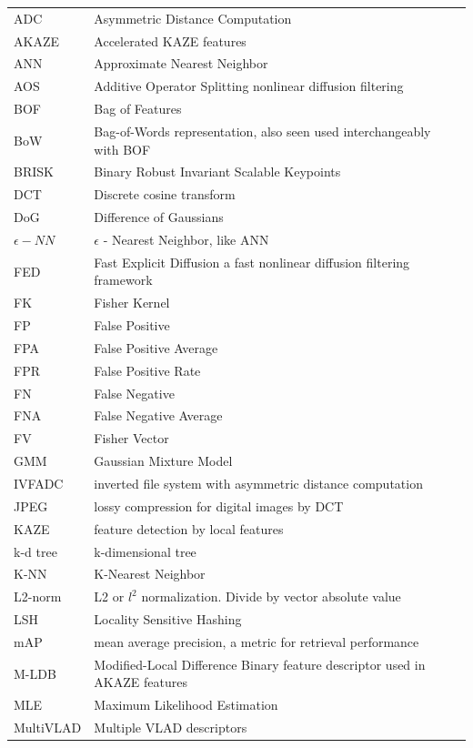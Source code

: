 \documentclass[english,12pt,a4paper,pdftex,elec,utf8, table]{aaltothesis}
\begin{document}
\begin{tabular}{ll}
  ADC & Asymmetric Distance Computation\\
  AKAZE & Accelerated KAZE features\\
  ANN & Approximate Nearest Neighbor\\
  AOS & Additive Operator Splitting nonlinear diffusion filtering\\
  BOF & Bag of Features\\
  BoW & Bag-of-Words representation, also seen used interchangeably with BOF\\
  BRISK & Binary Robust Invariant Scalable Keypoints\\
  DCT & Discrete cosine transform\\
  DoG & Difference of Gaussians\\
  $\epsilon -NN$ & $\epsilon$ - Nearest Neighbor, like ANN\\
  FED & Fast Explicit Diffusion a fast nonlinear diffusion filtering framework\\
  FK & Fisher Kernel\\
  FP & False Positive\\
  FPA & False Positive Average\\
  FPR & False Positive Rate\\
  FN & False Negative\\
  FNA & False Negative Average\\
  FV & Fisher Vector\\
  GMM & Gaussian Mixture Model\\
  IVFADC & inverted file system with asymmetric distance computation\\
  JPEG & lossy compression for digital images by DCT\\
  KAZE & feature detection by local features\\
  k-d tree & k-dimensional tree\\
  K-NN & K-Nearest Neighbor\\
  L2-norm & L2 or $l^2$ normalization. Divide by vector absolute value\\
  LSH & Locality Sensitive Hashing\\
  mAP & mean average precision, a metric for retrieval performance\\
  M-LDB & Modified-Local Difference Binary feature descriptor used in AKAZE features\\
  MLE & Maximum Likelihood Estimation\\
  MultiVLAD & Multiple VLAD descriptors\\
\end{tabular}
\end{document}
